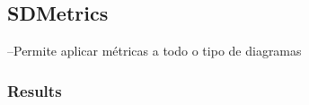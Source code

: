 \subsection{SDMetrics}
--Permite aplicar métricas a todo o tipo de diagramas
\subsubsection{Results}